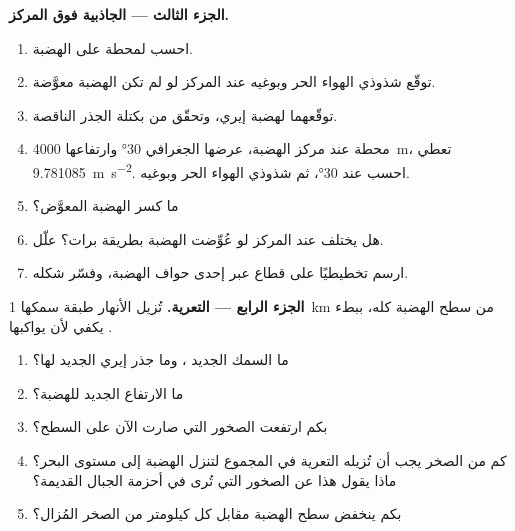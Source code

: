 \begin{problem}
\noindent\textbf{الجزء الثالث --- الجاذبية فوق المركز.}
\begin{enumerate}[resume]
  \item احسب  لمحطة على الهضبة.
  \item توقّع شذوذي الهواء الحر وبوغيه عند المركز لو لم تكن الهضبة معوَّضة.
  \item توقّعهما لهضبة إيري، وتحقّق من  بكتلة الجذر الناقصة.
  \item محطة عند مركز الهضبة، عرضها الجغرافي \ang{30} وارتفاعها \qty{4000}{m}، تعطي \qty{9.781085}{m.s^{-2}}. احسب  عند \ang{30}، ثم شذوذي الهواء الحر وبوغيه.
  \item ما كسر الهضبة المعوَّض؟
  \item هل يختلف  عند المركز لو عُوِّضت الهضبة بطريقة برات؟ علّل.
  \item ارسم تخطيطيًا  على قطاع عبر إحدى حواف الهضبة، وفسّر شكله.
\end{enumerate}

\noindent\textbf{الجزء الرابع --- التعرية.}
تُزيل الأنهار طبقة سمكها \qty{1}{km} من سطح الهضبة كله، ببطء يكفي لأن يواكبها .
\begin{enumerate}[resume]
  \item ما السمك الجديد ، وما جذر إيري الجديد لها؟
  \item ما الارتفاع الجديد للهضبة؟
  \item بكم ارتفعت الصخور التي صارت الآن على السطح؟
  \item كم من الصخر يجب أن تُزيله التعرية في المجموع لتنزل الهضبة إلى مستوى البحر؟ ماذا يقول هذا عن الصخور التي تُرى في أحزمة الجبال القديمة؟
  \item بكم ينخفض سطح الهضبة مقابل كل كيلومتر من الصخر المُزال؟
\end{enumerate}
\end{problem}
